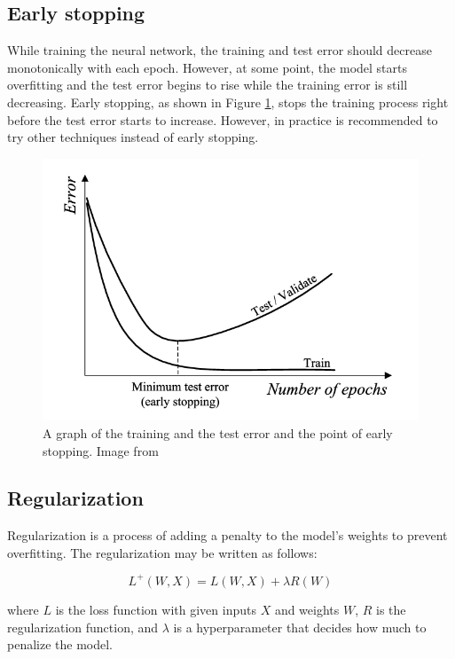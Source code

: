 \documentclass[thesis=B,english]{FITthesis}[2019/12/23]
\begin{document}
\subsection{Early stopping}

While training the neural network, the training and test error should decrease monotonically with each epoch. However, at some point, the model starts overfitting and the test error begins to rise while the training error is still decreasing. Early stopping, as shown in Figure \ref{fig:early_stopping}, stops the training process right before the test error starts to increase. However, in practice is recommended to try other techniques instead of early stopping.

\begin{figure}[ht]
		\includegraphics[scale=0.4]{images/early_stopping.png}
		\centering
		\caption{A graph of the training and the test error and the point of early stopping. Image from \cite{gencay_min_qi_2001}}
		\label{fig:early_stopping}
\end{figure}

\subsection{Regularization}

Regularization is a process of adding a penalty to the model's weights to prevent overfitting. The regularization may be written as follows:

$$L^+(W,X) = L(W,X) + \lambda R(W)$$

where $L$ is the loss function with given inputs $X$ and weights $W$, $R$ is the regularization function, and $\lambda$ is a hyperparameter that decides how much to penalize the model.
\end{document}
